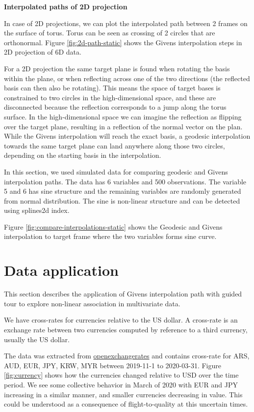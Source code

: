 \textbf{Interpolated paths of 2D projection}

In case of 2D projections, we can plot the interpolated path between 2
frames on the surface of torus. Torus can be seen as crossing of 2
circles that are orthonormal. Figure \ref{fig:2d-path-static} shows the
Givens interpolation steps in 2D projection of 6D data.

For a 2D projection the same target plane is found when rotating the
basis within the plane, or when reflecting across one of the two
directions (the reflected basis can then also be rotating). This means
the space of target bases is constrained to two circles in the
high-dimensional space, and these are disconnected because the
reflection corresponds to a jump along the torus surface. In the
high-dimensional space we can imagine the reflection as flipping over
the target plane, resulting in a reflection of the normal vector on the
plan. While the Givens interpolation will reach the exact basis, a
geodesic interpolation towards the same target plane can land anywhere
along those two circles, depending on the starting basis in the
interpolation.

In this section, we used simulated data for comparing geodesic and
Givens interpolation paths. The data has 6 variables and 500
observations. The variable 5 and 6 has sine structure and the remaining
variables are randomly generated from normal distribution. The sine is
non-linear structure and can be detected using splines2d index.

Figure \ref{fig:compare-interpolations-static} shows the Geodesic and
Givens interpolation to target frame where the two variables forms sine
curve.

\hypertarget{data-application}{%
\section{Data application}\label{data-application}}

This section describes the application of Givens interpolation path with
guided tour to explore non-linear association in multivariate data.

We have cross-rates for currencies relative to the US dollar. A
cross-rate is an exchange rate between two currencies computed by
reference to a third currency, usually the US dollar.

The data was extracted from
\href{https://openexchangerates.org}{openexchangerates} and contains
cross-rate for ARS, AUD, EUR, JPY, KRW, MYR between 2019-11-1 to
2020-03-31. Figure \ref{fig:currency} shows how the currencies changed
relative to USD over the time period. We see some collective behavior in
March of 2020 with EUR and JPY increasing in a similar manner, and
smaller currencies decreasing in value. This could be understood as a
consequence of flight-to-quality at this uncertain times.

